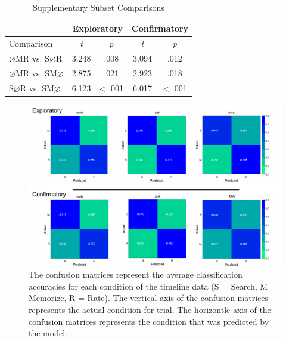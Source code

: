 \documentclass[
  english,
  man,floatsintext]{apa6}
\begin{document}
\begin{appendix}
\begin{table}[!h]
\centering
\caption{Supplementary Subset Comparisons}
\label{tab:supp-comparisons}
\begin{tabular}{l c c c c}
& \multicolumn{2}{c}{Exploratory} & \multicolumn{2}{c}{Confirmatory} \\
\hline
Comparison & \textit{t} & \multicolumn{1}{c|}{\textit{p}} & \textit{t} & \textit{p} \\
\hline
$\varnothing$MR vs. S$\varnothing$R & 3.248 & \multicolumn{1}{c|}{.008} & 3.094 & .012 \\
$\varnothing$MR vs. SM$\varnothing$ & 2.875 & \multicolumn{1}{c|}{.021} & 2.923 & .018 \\
S$\varnothing$R vs. SM$\varnothing$ & 6.123 & \multicolumn{1}{c|}{< .001} & 6.017 & < .001 \\
\hline
\end{tabular}
\end{table}

\begin{figure}
\centering
\includegraphics{supplementary_analysis/confusion_matrices/supp_conf_matrices.pdf}
\caption{\label{fig:supp-conf-matrices}The confusion matrices represent the
average classification accuracies for each condition of the timeline
data (S = Search, M = Memorize, R = Rate). The vertical axis of the
confusion matrices represents the actual condition for trial. The
horizontle axis of the confusion matrices represents the condition that
was predicted by the model.}
\end{figure}


\end{appendix}
\end{document}
